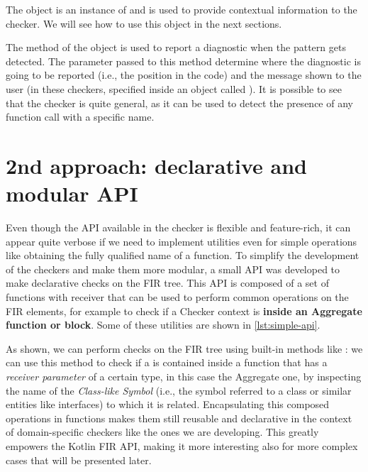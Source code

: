 \documentclass[12pt,a4paper,openright,twoside]{book}
\begin{document}


The  object is an instance of  and is 
used to provide contextual information to the checker. We will see how to 
use this object in the next sections.

The  method of the  object is used to report a
diagnostic when the pattern gets detected. The parameter passed to this method
determine where the diagnostic is going to be reported (i.e., the position in
the code) and the message shown to the user (in these checkers, specified inside
an object called ). It is possible to see that the 
checker is quite general, as it can be used to detect the presence of any 
function call with a specific name.

\section{2nd approach: declarative and modular API}

Even though the API available in the checker is flexible and feature-rich, it
can appear quite verbose if we need to implement utilities even for simple
operations like obtaining the fully qualified name of a function. To simplify
the development of the checkers and make them more modular, a small API was
developed to make declarative checks on the \ac{FIR} tree. This API is composed
of a set of functions with receiver that can be used to perform common
operations on the \ac{FIR} elements, for example to check if a Checker context
is \textbf{inside an Aggregate function or block}. Some of these utilities are
shown in \cref{lst:simple-api}.



As shown, we can perform checks on the \ac{FIR} tree using built-in methods like
: we can use this method to check if a
 is contained inside a function that has a \emph{receiver
parameter} of a certain type, in this case the Aggregate one, by
inspecting the name of the \emph{Class-like Symbol} (i.e., the symbol referred
to a class or similar entities like interfaces) to which it is related. 
%
Encapsulating this composed operations in functions makes them still reusable
and declarative in the context of domain-specific checkers like the ones we are
developing. This greatly empowers the Kotlin \ac{FIR} API, making it more
interesting also for more complex cases that will be presented later.
\end{document}
